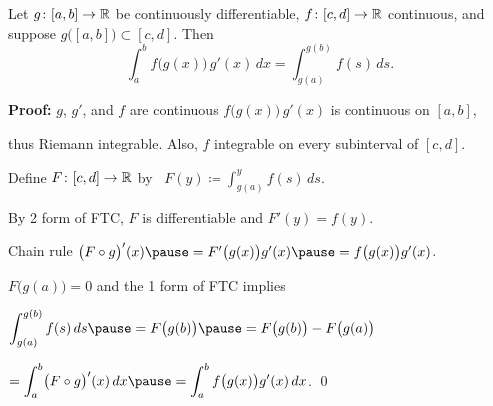 \documentclass[10pt,aspectratio=169]{beamer}
\begin{document}
\begin{frame}

\begin{theorem}
Let $g \colon [a,b] \to {\mathbb{R}}$ be continuously differentiable,
\pause
$f \colon [c,d] \to {\mathbb{R}}$ continuous,
\pause
and suppose
$g\bigl([a,b]\bigr) \subset [c,d]$.
\pause
Then
\vspace*{-6pt}
\begin{equation*}
\int_a^b f\bigl(g(x)\bigr)\, g'(x)\, dx =
\int_{g(a)}^{g(b)} f(s)\, ds .
\end{equation*}
\end{theorem}

\pause
\textbf{Proof:}
$g$, $g'$, and $f$ are continuous
\pause
\wthus $f\bigl(g(x)\bigr)\,g'(x)$
is continuous on $[a,b]$,

\pause
thus Riemann integrable.
\pause
\quad
Also, $f$ integrable on every subinterval of $[c,d]$.

\pause
\medskip

Define $F \colon [c,d] \to {\mathbb{R}}$ by~
$F(y) \coloneqq \int_{g(a)}^{y} f(s)\,ds$.

\pause
By 2 form of FTC, $F$ is differentiable and $F'(y) = f(y)$.

\pause
Chain
rule \wthus
$\bigl( F \circ g \bigr)' (x)
\pause
=
F'\bigl(g(x)\bigr) g'(x)
\pause
=
f\bigl(g(x)\bigr) g'(x)$.

\pause
$F\bigl(g(a)\bigr) = 0$ and
the 1 form of FTC implies

\pause
\medskip

$\displaystyle
\int_{g(a)}^{g(b)} f(s)\,ds
\pause
= F\bigl(g(b)\bigr)
\pause
= F\bigl(g(b)\bigr)-F\bigl(g(a)\bigr)
$

\pause
\qquad
$\displaystyle
=
\int_a^b 
\bigl( F \circ g \bigr)' (x) \,dx
\pause
=
\int_a^b 
f\bigl(g(x)\bigr) g'(x)
\,dx$.
\qed
\end{frame}
\end{document}

